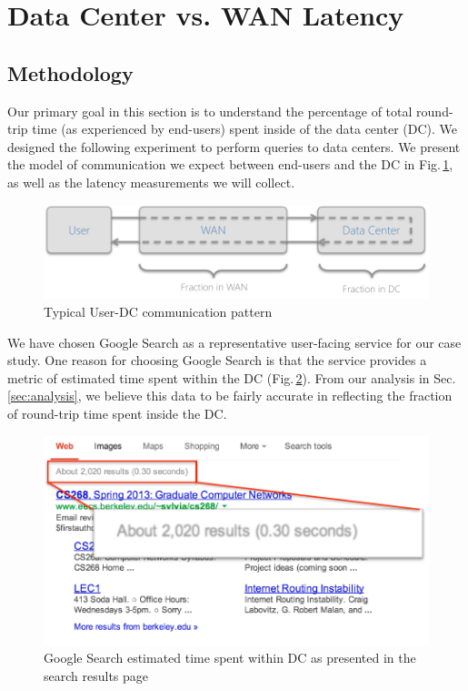 \section{Data Center vs. WAN Latency}
\label{sec:latency-DC}

\subsection{Methodology}
Our primary goal in this section is to understand the percentage of total round-trip time (as experienced by end-users) spent inside of the data center (DC). We designed the following experiment to perform queries to data centers. We present the model of communication we expect between end-users and the DC in Fig.\,\ref{fig:DC_model}, as well as the latency measurements we will collect. 

\begin{figure}
  \centering
  \includegraphics[width=\linewidth]{../figs/DC_model.pdf}
  \vspace{-1em}
  \caption{Typical User-DC communication pattern}
  \label{fig:DC_model}
\end{figure}

We have chosen Google Search as a representative user-facing service for our case study. One reason for choosing Google Search is that the service provides a metric of estimated time spent within the DC (Fig.\,\ref{fig:google_time}). From our analysis in Sec.\,\ref{sec:analysis}, we believe this data to be fairly accurate in reflecting the fraction of round-trip time spent inside the DC.

\begin{figure}[t]
  \centering
  \includegraphics[width=0.85\linewidth]{../figs/GoogleTime.pdf}
  \vspace{-0.7em}
  \caption{Google Search estimated time spent within DC as presented in the search results page}
  \label{fig:google_time}
\end{figure}

